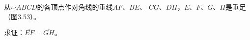 \begin{figure}
    \begin{minipage}[t]{0.48\linewidth}
    \centering
\begin{tikzpicture}[>=latex, scale=1]
    \end{tikzpicture}
    \caption{}
    \end{minipage}
    \begin{minipage}[t]{0.48\linewidth}
    \centering
    \begin{tikzpicture}[>=latex, scale=1]
    \end{tikzpicture}
    \caption{}
    \end{minipage}
    \end{figure}

\begin{example}
    从$\parallelogram ABCD$的各顶点作对角线的垂线$AF$、$BE$、
$CG$、$DH$，$E$、$F$、$G$、$H$是垂足（图3.53）。

求证：$\overline{EF}=\overline{GH}$。
\end{example}

